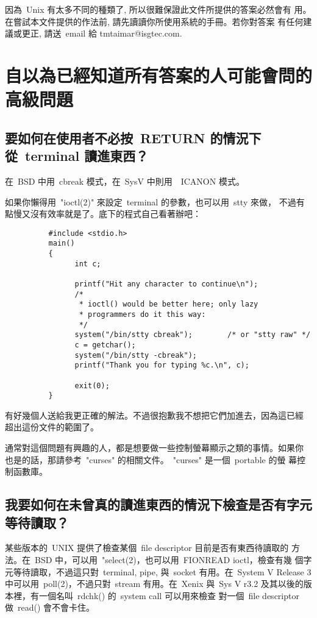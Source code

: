 \documentclass{article}
\begin{document}
\begin{CJK*}{Bg5}{ming}
因為~Unix 有太多不同的種類了, 所以很難保證此文件所提供的答案必然會有
用。在嘗試本文件提供的作法前, 請先讀讀你所使用系統的手冊。若你對答案
有任何建議或更正, 請送~email 給 tmtaimar@isgtec.com.

\setcounter{section}{3}
\section{自以為已經知道所有答案的人可能會問的高級問題}
\subsection{要如何在使用者不必按~RETURN 的情況下從~terminal 讀進東西？}

	在~BSD 中用~cbreak 模式，在~SysV 中則用~~ICANON 模式。

	如果你懶得用~"ioctl(2)" 來設定~terminal 的參數，也可以用~stty 來做，
        不過有點慢又沒有效率就是了。底下的程式自己看著辦吧：
\small
\begin{verbatim}
	      #include <stdio.h>
	      main()
	      {
        	    int c;

	            printf("Hit any character to continue\n");
        	    /*
	             * ioctl() would be better here; only lazy
        	     * programmers do it this way:
	             */
        	    system("/bin/stty cbreak");        /* or "stty raw" */
	            c = getchar();
	            system("/bin/stty -cbreak");
	            printf("Thank you for typing %c.\n", c);

	            exit(0);
	      }
\end{verbatim}
\normalsize
	有好幾個人送給我更正確的解法。不過很抱歉我不想把它們加進去，因為這已經
	超出這份文件的範圍了。

	通常對這個問題有興趣的人，都是想要做一些控制螢幕顯示之類的事情。如果你
	也是的話，那請參考~"curses" 的相關文件。~"curses" 是一個~portable 的螢
        幕控制函數庫。

\subsection{我要如何在未曾真的讀進東西的情況下檢查是否有字元等待讀取？}

	某些版本的~UNIX 提供了檢查某個~file descriptor 目前是否有東西待讀取的
        方法。在~BSD 中，可以用~"select(2)，也可以用~FIONREAD ioctl，檢查有幾
        個字元等待讀取，不過這只對~terminal, pipe, 與~socket 有用。在~System 
        V Release 3 中可以用~poll(2)，不過只對~stream 有用。在~Xenix 與~Sys V 
        r3.2 及其以後的版本裡，有一個名叫~rdchk() 的~system call 可以用來檢查
        對一個~file descriptor 做~read() 會不會卡住。


\end{CJK*}
\end{document}
